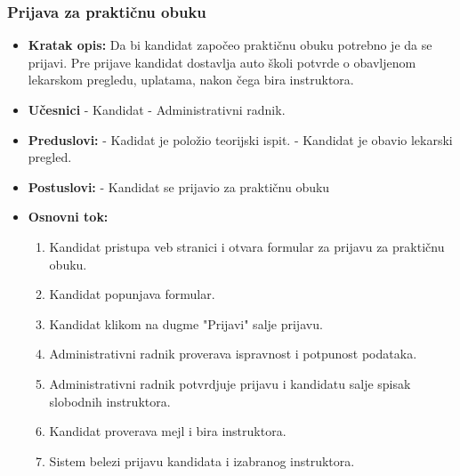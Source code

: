 \subsubsection{Prijava za praktičnu obuku}

\vspace{3mm}

\begin{itemize}

\item \textbf{Kratak opis:} Da bi kandidat započeo praktičnu obuku potrebno je da se prijavi. Pre prijave kandidat dostavlja auto školi potvrde o obavljenom lekarskom pregledu, uplatama, nakon čega bira instruktora.

\vspace{2mm}

\item \textbf{Učesnici} \newline
   - Kandidat \newline 
   - Administrativni radnik.

\item \textbf{Preduslovi:} \newline
   - Kadidat je položio teorijski ispit. \newline 
   - Kandidat je obavio lekarski pregled. 

\item \textbf{Postuslovi:} \newline
    - Kandidat se prijavio za praktičnu obuku 

\item \textbf{Osnovni tok:}  
   \begin{enumerate}
   \item Kandidat pristupa veb stranici i otvara formular za prijavu za praktičnu obuku.
   \item Kandidat popunjava formular.
   \item Kandidat klikom na dugme "Prijavi" salje prijavu.
   \item Administrativni radnik proverava ispravnost i potpunost podataka.
   \item Administrativni radnik potvrdjuje prijavu i kandidatu salje spisak slobodnih instruktora.
   \item Kandidat proverava mejl i bira instruktora.
   \item Sistem belezi prijavu kandidata i izabranog instruktora.
   \end{enumerate}


\end{itemize}
